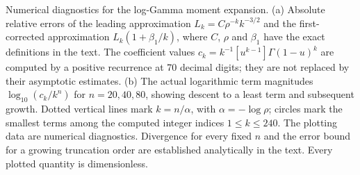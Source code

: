 Numerical diagnostics for the log-Gamma moment expansion.  (a) Absolute
relative errors of the leading approximation $L_k=C\rho^{-k}k^{-3/2}$ and the
first-corrected approximation $L_k(1+\beta_1/k)$, where $C$, $\rho$ and
$\beta_1$ have the exact definitions in the text.  The coefficient values
$c_k=k^{-1}[u^{k-1}]\Gamma(1-u)^k$ are computed by a positive recurrence at
70 decimal digits; they are not replaced by their asymptotic estimates.
(b) The actual logarithmic term magnitudes $\log_{10}(c_k/k^n)$ for
$n=20,40,80$, showing descent to a least term and subsequent growth.  Dotted
vertical lines mark $k=n/\alpha$, with $\alpha=-\log\rho$; circles mark the
smallest terms among the computed integer indices $1\le k\le240$.
The plotting data are numerical diagnostics.  Divergence for every fixed
$n$ and the error bound for a growing truncation order are established
analytically in the text.  Every plotted quantity is dimensionless.
